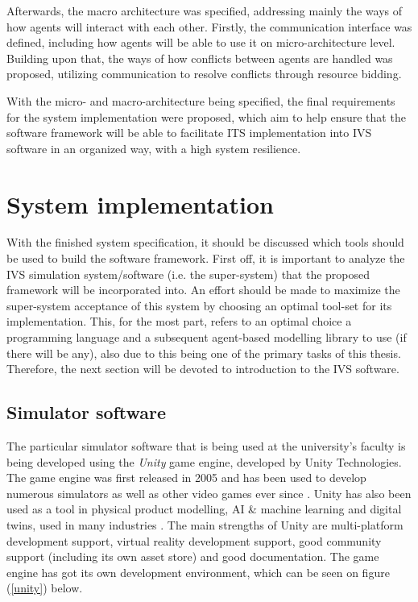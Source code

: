 \documentclass[main.tex]{subfiles}
\begin{document}
Afterwards, the macro architecture was specified, addressing mainly the ways of how agents will interact with each other. 
Firstly, the communication interface was defined, including how agents will be able to use it on micro-architecture level.
Building upon that, the ways of how conflicts between agents are handled was proposed, utilizing communication to resolve 
conflicts through resource bidding. 

With the micro- and macro-architecture being specified, the final requirements for the system implementation were proposed, 
which aim to help ensure that the software framework will be able to facilitate ITS implementation into IVS software in an 
organized way, with a high system resilience.

\section{System implementation}

With the finished system specification, it should be discussed which tools should be used to build the software framework. 
First off, it is important to analyze the IVS simulation system/software (i.e. the super-system) that
the proposed framework will be incorporated into. An effort should be made to maximize the super-system acceptance of 
this system by choosing an optimal tool-set for its implementation. This, for the most part,
refers to an optimal choice a programming language and a subsequent agent-based modelling
library to use (if there will be any), also due to this being one of the primary tasks of this thesis. 
Therefore, the next section will be devoted to introduction to the IVS software.

\subsection{Simulator software}

The particular simulator software that is being used at the university's faculty is being
developed using the \emph{Unity} game engine, developed by Unity Technologies. The game engine
was first released in 2005 and has been used to develop numerous simulators as well as other
video games ever since \cite{UnityTechnologies2022}.  Unity has also been used as a tool in
physical product modelling, AI \& machine learning and digital twins, used in many industries
\cite{UnityTechnologies2022a}.  The main strengths of Unity are multi-platform development
support, virtual reality development support, good community support (including its own asset
store) and good documentation. The game engine has got its own development environment, which 
can be seen on figure (\ref{unity}) below.
\end{document}
